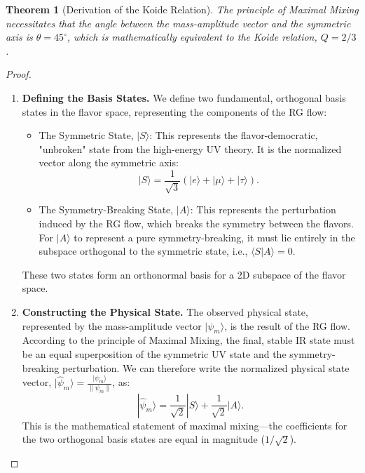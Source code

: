 \documentclass[11pt, letterpaper]{report}
\theoremstyle{plain} %
\newtheorem{theorem}{Theorem}[chapter]
\theoremstyle{definition} %
\theoremstyle{remark} %
\begin{document}
\begin{theorem}[Derivation of the Koide Relation]
\label{thm:derive_koide_from_mixing}
The principle of Maximal Mixing necessitates that the angle between the mass-amplitude vector and the symmetric axis is $\theta = 45^\circ$, which is mathematically equivalent to the Koide relation, $Q=2/3$.
\end{theorem}
\begin{proof}
\begin{enumerate}
    \item \textbf{Defining the Basis States.} We define two fundamental, orthogonal basis states in the flavor space, representing the components of the RG flow:
    \begin{itemize}
        \item The Symmetric State, $|S\rangle$: This represents the flavor-democratic, "unbroken" state from the high-energy UV theory. It is the normalized vector along the symmetric axis:
        $$ |S\rangle = \frac{1}{\sqrt{3}}(|e\rangle + |\mu\rangle + |\tau\rangle). $$
        \item The Symmetry-Breaking State, $|A\rangle$: This represents the perturbation induced by the RG flow, which breaks the symmetry between the flavors. For $|A\rangle$ to represent a pure symmetry-breaking, it must lie entirely in the subspace orthogonal to the symmetric state, i.e., $\langle S | A \rangle = 0$.
    \end{itemize}
    These two states form an orthonormal basis for a 2D subspace of the flavor space.

    \item \textbf{Constructing the Physical State.} The observed physical state, represented by the mass-amplitude vector $|\psi_m\rangle$, is the result of the RG flow. According to the principle of Maximal Mixing, the final, stable IR state must be an equal superposition of the symmetric UV state and the symmetry-breaking perturbation. We can therefore write the normalized physical state vector, $|\hat{\psi}_m\rangle = \frac{|\psi_m\rangle}{\|\psi_m\|}$, as:
    \begin{equation}
        |\hat{\psi}_m\rangle = \frac{1}{\sqrt{2}}|S\rangle + \frac{1}{\sqrt{2}}|A\rangle.
    \end{equation}
    This is the mathematical statement of maximal mixing—the coefficients for the two orthogonal basis states are equal in magnitude ($1/\sqrt{2}$).


\end{enumerate}
\end{proof}
\end{document}
